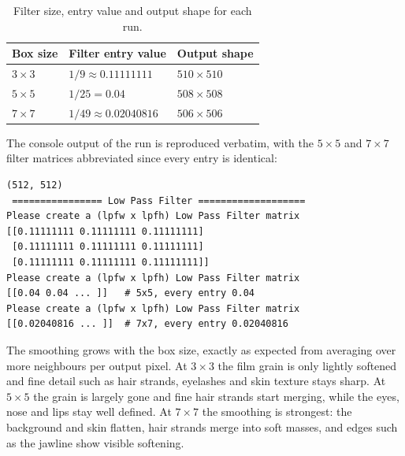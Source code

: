 \begin{table}[ht]
\centering
\caption{Filter size, entry value and output shape for each run.}
\label{tab:hw3-results}
\begin{tabular}{lll}
\toprule
Box size & Filter entry value & Output shape \\
\midrule
$3\times3$ & $1/9 \approx 0.11111111$  & $510\times510$ \\
$5\times5$ & $1/25 = 0.04$             & $508\times508$ \\
$7\times7$ & $1/49 \approx 0.02040816$ & $506\times506$ \\
\bottomrule
\end{tabular}
\end{table}

The console output of the run is reproduced verbatim, with the $5\times5$ and
$7\times7$ filter matrices abbreviated since every entry is identical:

\begin{lstlisting}[style=shell,caption={Console output of the program.},label={lst:hw3-out}]
(512, 512)
 ================ Low Pass Filter ===================
Please create a (lpfw x lpfh) Low Pass Filter matrix
[[0.11111111 0.11111111 0.11111111]
 [0.11111111 0.11111111 0.11111111]
 [0.11111111 0.11111111 0.11111111]]
Please create a (lpfw x lpfh) Low Pass Filter matrix
[[0.04 0.04 ... ]]   # 5x5, every entry 0.04
Please create a (lpfw x lpfh) Low Pass Filter matrix
[[0.02040816 ... ]]  # 7x7, every entry 0.02040816
\end{lstlisting}

The smoothing grows with the box size, exactly as expected from averaging over
more neighbours per output pixel. At $3\times3$ the film grain is only lightly
softened and fine detail such as hair strands, eyelashes and skin texture
stays sharp. At $5\times5$ the grain is largely gone and fine hair strands
start merging, while the eyes, nose and lips stay well defined. At $7\times7$
the smoothing is strongest: the background and skin flatten, hair strands
merge into soft masses, and edges such as the jawline show visible softening.
